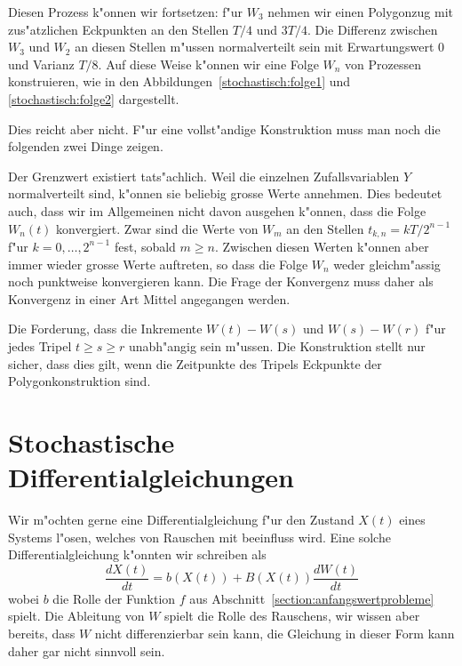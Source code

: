 Diesen Prozess k"onnen wir fortsetzen: f"ur $W_3$ nehmen wir einen
Polygonzug mit zus"atzlichen Eckpunkten an den Stellen $T/4$ und $3T/4$.
Die Differenz zwischen $W_3$ und $W_2$ an diesen Stellen m"ussen
normalverteilt sein mit Erwartungswert $0$ und Varianz $T/8$.
Auf diese Weise k"onnen wir eine Folge $W_n$ von Prozessen konstruieren,
wie in den Abbildungen~\ref{stochastisch:folge1} und \ref{stochastisch:folge2}
dargestellt.

Dies reicht aber nicht.
F"ur eine vollst"andige Konstruktion muss man noch die folgenden zwei
Dinge zeigen.
\begin{compactenum}
\item
Der Grenzwert existiert tats"achlich.
Weil die einzelnen Zufallsvariablen $Y$ normalverteilt sind, k"onnen
sie beliebig grosse Werte annehmen.
Dies bedeutet auch, dass wir im Allgemeinen nicht davon ausgehen 
k"onnen, dass die Folge $W_n(t)$ konvergiert.
Zwar sind die Werte von $W_m$ an den Stellen $t_{k,n}=kT/2^{n-1}$ f"ur
$k=0,\dots,2^{n-1}$ fest, sobald $m\ge n$.
Zwischen diesen Werten k"onnen aber immer wieder grosse Werte auftreten,
so dass die Folge $W_n$ weder gleichm"assig noch punktweise konvergieren
kann.
Die Frage der Konvergenz muss daher als Konvergenz in einer Art Mittel 
angegangen werden.
\item
Die Forderung, dass die Inkremente $W(t)-W(s)$ und $W(s)-W(r)$ f"ur jedes 
Tripel $t \ge s\ge r$ unabh"angig sein m"ussen.
Die Konstruktion stellt nur sicher, dass dies gilt, wenn die Zeitpunkte
des Tripels Eckpunkte der Polygonkonstruktion sind.
\end{compactenum}

%
%
%
\section{Stochastische Differentialgleichungen\label{section:stochdgl}}
Wir m"ochten gerne eine Differentialgleichung f"ur den Zustand
$X(t)$ eines Systems l"osen, welches von Rauschen mit beeinfluss wird.
Eine solche Differentialgleichung k"onnten wir schreiben als
\[
\frac{dX(t)}{dt}
=
b(X(t)) + B(X(t))\frac{dW(t)}{dt}
\]
wobei $b$ die Rolle der Funktion $f$ aus
Abschnitt~\ref{section:anfangswertprobleme} spielt.
Die Ableitung von $W$ spielt die Rolle des Rauschens, wir wissen aber
bereits, dass $W$ nicht differenzierbar sein kann, die Gleichung
in dieser Form kann daher gar nicht sinnvoll sein.


